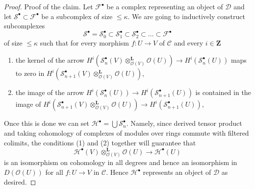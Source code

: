 \begin{proof}
\medskip\noindent
Proof of the claim. Let $\mathcal{F}^\bullet$ be a complex representing
an object of $\mathcal{D}$ and let
$\mathcal{S}^\bullet \subset \mathcal{F}^\bullet$ be a subcomplex of
size $\leq \kappa$. We are going to inductively construct subcomplexes
$$
\mathcal{S}^\bullet = \mathcal{S}_0^\bullet \subset
\mathcal{S}_1^\bullet \subset
\mathcal{S}_2^\bullet \subset \ldots \subset \mathcal{F}^\bullet
$$
of size $\leq \kappa$ such that for every morphism $f : U \to V$
of $\mathcal{C}$ and every $i \in \mathbf{Z}$
\begin{enumerate}
\item the kernel of the arrow
$H^i(\mathcal{S}_n^\bullet(V)
\otimes_{\mathcal{O}(V)}^\mathbf{L} \mathcal{O}(U)) \to
H^i(\mathcal{S}_n^\bullet(U))$
maps to zero in
$H^i(\mathcal{S}_{n + 1}^\bullet(V)
\otimes_{\mathcal{O}(V)}^\mathbf{L} \mathcal{O}(U))$,
\item the image of the arrow
$H^i(\mathcal{S}_n^\bullet(U)) \to H^i(\mathcal{S}_{n + 1}^\bullet(U))$
is contained in the image of
$H^i(\mathcal{S}_{n + 1}^\bullet(V)
\otimes_{\mathcal{O}(V)}^\mathbf{L} \mathcal{O}(U)) \to
H^i(\mathcal{S}_{n + 1}^\bullet(U))$,
\end{enumerate}
Once this is done we can set
$\mathcal{H}^\bullet = \bigcup \mathcal{S}_n^\bullet$.
Namely, since derived tensor product and taking cohomology of
complexes of modules over rings commute with filtered
colimits, the conditions (1) and (2) together will guarantee
that
$$
\mathcal{H}^\bullet(V) \otimes_{\mathcal{O}(V)}^\mathbf{L} \mathcal{O}(U)
\longrightarrow
\mathcal{H}^\bullet(U)
$$
is an isomorphism on cohomology in all degrees and hence an isomorphism
in $D(\mathcal{O}(U))$ for all $f : U \to V$ in $\mathcal{C}$.
Hence $\mathcal{H}^\bullet$ represents an object of $\mathcal{D}$ as
desired.


\end{proof}
